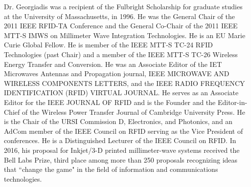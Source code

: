 \documentclass[journal]{IEEEtran}
\begin{document}
\begin{IEEEbiography}
Dr. Georgiadis was a recipient of the Fulbright Scholarship for graduate studies at the University of Massachusetts, in 1996. He was the General Chair of the 2011 IEEE RFID-TA Conference and the General Co-Chair of the 2011 IEEE MTT-S IMWS on Millimeter Wave Integration Technologies. He is an EU Marie Curie Global Fellow. He is member of the IEEE MTT-S TC-24 RFID Technologies (past Chair) and a member of the IEEE MTT-S TC-26 Wireless Energy Transfer and Conversion. He was an Associate Editor of the IET Microwaves Antennas and Propagation journal, IEEE MICROWAVE AND WIRELESS COMPONENTS LETTERS, and the IEEE RADIO FREQUENCY IDENTIFICATION (RFID) VIRTUAL JOURNAL. He serves as an Associate Editor for the IEEE JOURNAL OF RFID and is the Founder and the Editor-in-Chief of the Wireless Power Transfer Journal of Cambridge University Press. He is the Chair of the URSI Commission D, Electronics, and Photonics, and an AdCom member of the IEEE Council on RFID serving as the Vice President of conferences. He is a Distinguished Lecturer of the IEEE Council on RFID. In 2016, his proposal for Inkjet/3-D printed millimeter-wave systems received the Bell Labs Prize, third place among more than 250 proposals recognizing ideas that ``change the game" in the field of information and communications technologies.
\end{IEEEbiography}
\end{document}
